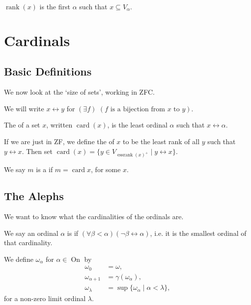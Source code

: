\documentclass[a4paper, 10pt, twocolumn]{amsart}
\newcommand{\card}{\operatorname{card}}
\newcommand{\on}{\operatorname{On}}
\begin{document}
\begin{proposition}
  $\operatorname{rank}(x)$ is the first $\alpha$ such that $x \subseteq V_\alpha$.
\end{proposition}

\section{Cardinals}

\subsection{Basic Definitions}
We now look at the `size of sets', working in ZFC.

\begin{remark}[Notation]
    We will write $x \leftrightarrow y$ for $(\exists f)$ $(f \text{ is a bijection from $x$ to $y$})$.
\end{remark}

\begin{definition}[Cardinality]
  The  of a set $x$, written $\card(x)$, is the least ordinal $\alpha$ such that $x \leftrightarrow \alpha$.
\end{definition}

\begin{remark}
  If we are just in ZF, we define the  of $x$ to be the least rank of all $y$ such that $y \leftrightarrow x$. Then set $\card(x) = \{y \in V_{\operatorname{essrank}(x)^+} \mid y \leftrightarrow x\}$. 
\end{remark}


\begin{definition}[Cardinal]
  We say $m$ is a  if $m = \card x$, for some $x$.
\end{definition}

\subsection{The Alephs}
We want to know what the cardinalities of the ordinals are.

\begin{definition}
  We say an ordinal $\alpha$ is  if $(\forall \beta < \alpha)(\lnot \beta \leftrightarrow \alpha)$, i.e. it is the smallest ordinal of that cardinality.
\end{definition}

\begin{definition}
  We define $\omega_\alpha$ for $\alpha \in \on$ by
  \begin{align*}
    \omega_0 &= \omega, \\
    \omega_{\alpha + 1}&= \gamma(\omega_\alpha), \\
    \omega_{\lambda} &= \sup\{\omega_\alpha\mid \alpha < \lambda\},
  \end{align*}
  for a non-zero limit ordinal $\lambda$.
\end{definition}
\end{document}
